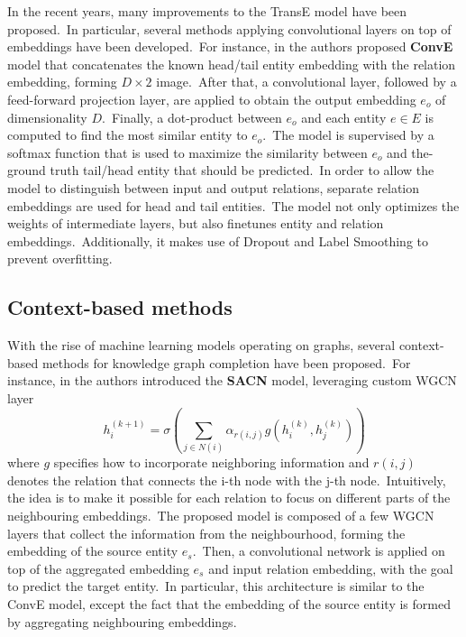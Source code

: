 \documentclass[longabstract, english, mgr]{iithesis}
\theoremstyle{default_theorem_style}\newtheorem{theorem}{Theorem}
\theoremstyle{default_theorem_style}\newtheorem{definition}{Definition}
\begin{document}
\noindent In the recent years, many improvements to the TransE model have been proposed.\ In particular, several
methods applying convolutional layers on top of embeddings have been developed.\ For instance, in \cite{conve_model} the
authors proposed \textbf{ConvE} model that concatenates the known head/tail entity embedding with the relation
embedding, forming $D \times 2$ image.\ After that, a convolutional layer, followed by a feed-forward projection layer,
are applied to obtain the output embedding $e_o$ of dimensionality $D$.\ Finally, a dot-product between $e_o$ and each
entity $e \in E$ is computed to find the most similar entity to $e_o$.\ The model is supervised by a softmax function
that is used to maximize the similarity between $e_o$ and the-ground truth tail/head entity that should be
predicted.\ In order to allow the model to distinguish between input and output relations, separate
relation embeddings are used for head and tail entities.\ The model not only optimizes the weights of intermediate
layers, but also finetunes entity and relation embeddings.\ Additionally, it makes use of Dropout and Label
Smoothing to prevent overfitting.

\subsection{Context-based methods}

With the rise of machine learning models operating on graphs, several context-based methods for knowledge graph
completion have been proposed.\ For instance, in \cite{sacn_model} the authors introduced the \textbf{SACN} model,
leveraging custom WGCN layer
$$
h_i^{(k + 1)} = \sigma(\sum_{j \in N(i)} \alpha_{r(i, j)} g(h_i^{(k)}, h_j^{(k)}))
$$
where $g$ specifies how to incorporate neighboring information and $r(i, j)$ denotes the relation that connects the i-th
node with the j-th node.\ Intuitively, the idea is to make it possible for each relation to focus on different parts
of the neighbouring embeddings.\ The proposed model is composed of a few WGCN layers that collect the information from
the neighbourhood, forming the embedding of the source entity $e_s$.\ Then, a convolutional network is applied on top of
the aggregated embedding $e_s$ and input relation embedding, with the goal to predict the target entity.\ In particular,
this architecture is similar to the ConvE model, except the fact that the embedding of the source entity is formed by
aggregating neighbouring embeddings.\newline
\end{document}
